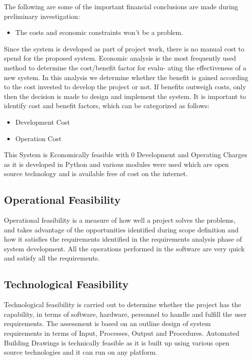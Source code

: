 The following are some of the important financial conclusions are made during preliminary investigation:
\begin{itemize}
	\item The costs and economic constraints won't be a problem.
\end{itemize}

Since the system is developed as part of project work, there is no manual cost to spend for the proposed system. 
\noindent Economic analysis is the most frequently used method to determine the cost/benefit factor for evalu-
ating the effectiveness of a new system. In this analysis we determine whether the benefit is gained
according to the cost invested to develop the project or not. If benefits outweigh costs, only then
the decision is made to design and implement the system. It is important to identify cost and benefit
factors, which can be categorized as follows:
\begin{itemize}
\item Development Cost
\item Operation Cost
\end{itemize}
This System is Economically feasible with 0 Development and Operating Charges
as it is developed in Python and various modules were used which are open source technology and is available free of cost on the internet.

\subsection{Operational Feasibility}
\noindent Operational feasibility is a measure of how well a project solves the problems, and takes advantage of the opportunities identified during scope definition and how it satisfies the requirements identified in the requirements analysis phase of system development. All the operations performed in the software are very quick and satisfy all the requirements.
\subsection{Technological Feasibility}
\noindent Technological feasibility is carried out to determine whether the project has the capability, in terms
of software, hardware, personnel to handle and fulfill the user requirements. The assessment is based
on an outline design of system requirements in terms of Input, Processes, Output and Procedures.
Automated Building Drawings is technically feasible as it is built up using various open source technologies and it can run on any platform.\\

